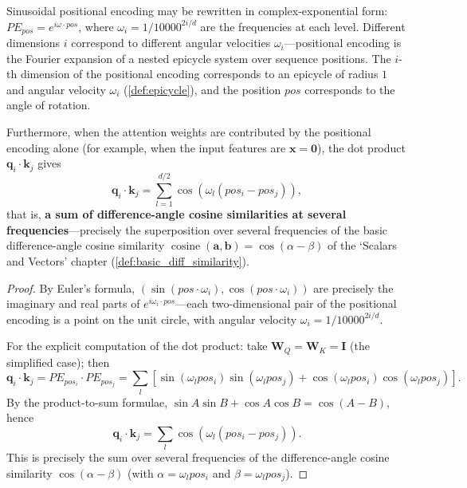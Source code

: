 \begin{proposition}\label{prop:positional_encoding_fourier}
Sinusoidal positional encoding may be rewritten in complex-exponential form: $PE_{pos} = e^{i \omega \cdot pos}$, where $\omega_i = 1/10000^{2i/d}$ are the frequencies at each level. Different dimensions $i$ correspond to different angular velocities $\omega_i$---positional encoding is the Fourier expansion of a nested epicycle system over sequence positions. The $i$-th dimension of the positional encoding corresponds to an epicycle of radius $1$ and angular velocity $\omega_i$ (\cref{def:epicycle}), and the position $pos$ corresponds to the angle of rotation.

Furthermore, when the attention weights are contributed by the positional encoding alone (for example, when the input features are $\mathbf{x} = \mathbf{0}$), the dot product $\mathbf{q}_i \cdot \mathbf{k}_j$ gives
\[
\mathbf{q}_i \cdot \mathbf{k}_j = \sum_{l=1}^{d/2} \cos(\omega_l (pos_i - pos_j)),
\]
that is, \textbf{a sum of difference-angle cosine similarities at several frequencies}---precisely the superposition over several frequencies of the basic difference-angle cosine similarity $\operatorname{cosine}(\mathbf{a},\mathbf{b}) = \cos(\alpha - \beta)$ of the `Scalars and Vectors' chapter (\cref{def:basic_diff_similarity}).
\end{proposition}

\begin{proof}
By Euler's formula, $(\sin(pos \cdot \omega_i), \cos(pos \cdot \omega_i))$ are precisely the imaginary and real parts of $e^{i\omega_i \cdot pos}$---each two-dimensional pair of the positional encoding is a point on the unit circle, with angular velocity $\omega_i = 1/10000^{2i/d}$.

For the explicit computation of the dot product: take $\mathbf{W}_Q = \mathbf{W}_K = \mathbf{I}$ (the simplified case); then
\[
\mathbf{q}_i \cdot \mathbf{k}_j = PE_{pos_i} \cdot PE_{pos_j} = \sum_{l} \left[\sin(\omega_l pos_i)\sin(\omega_l pos_j) + \cos(\omega_l pos_i)\cos(\omega_l pos_j)\right].
\]
By the product-to-sum formulae, $\sin A\sin B + \cos A\cos B = \cos(A - B)$, hence
\[
\mathbf{q}_i \cdot \mathbf{k}_j = \sum_{l} \cos(\omega_l (pos_i - pos_j)).
\]
This is precisely the sum over several frequencies of the difference-angle cosine similarity $\cos(\alpha - \beta)$ (with $\alpha = \omega_l pos_i$ and $\beta = \omega_l pos_j$).
\end{proof}

